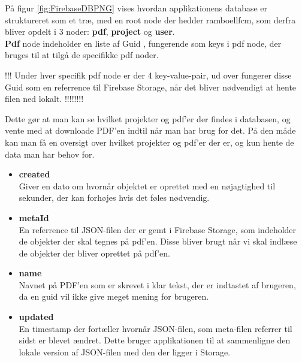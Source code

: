 På figur \ref{fig:FirebaseDBPNG} vises hvordan applikationens database er struktureret som et træ, med en root node\cite{rootNode} der hedder ramboellfcm, som derfra bliver opdelt i 3 noder:
\textbf{pdf}, \textbf{project} og \textbf{user}.\\

\textbf{Pdf} node indeholder en liste af Guid \cite{GUID}, fungerende som keys i pdf node, der bruges til at tilgå de specifikke pdf noder.  

!!! Under hver specifik pdf node er der 4 key-value-pair\cite{KVP}, ud over fungerer disse Guid som en referrence til Firebase Storage, når det bliver nødvendigt at hente filen ned lokalt.  !!!!!!!!

Dette gør at man kan se hvilket projekter og pdf'er der findes i databasen, og vente med at downloade PDF'en indtil når man har brug for det. På den måde kan man få en oversigt over hvilket projekter og pdf'er der er, og kun hente de data man har behov for. 
\begin{itemize}
	\item \textbf{created}\\
	Giver en dato om hvornår objektet er oprettet med en nøjagtighed til sekunder, der kan forhøjes hvis det føles nødvendig.\\
	\item \textbf{metaId}\\
	En referrence til JSON-filen der er gemt i Firebase Storage\cite{FirebaseStorage}, som indeholder de objekter der skal tegnes på pdf'en. Disse bliver brugt når vi skal indlæse de objekter der bliver oprettet på pdf'en.\\ 
	
	\item \textbf{name}\\
	Navnet på PDF'en som er skrevet i klar tekst, der er indtastet af brugeren, da en guid vil ikke give meget mening for brugeren.\\
	
	\item \textbf{updated}\\
	En timestamp der fortæller hvornår JSON-filen, som meta-filen referrer til sidst er blevet ændret. Dette bruger applikationen til at sammenligne den lokale version af JSON-filen med den der ligger i Storage.   
\end{itemize}

